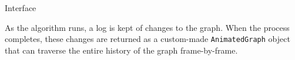 \documentclass{beamer}
\begin{document}
\begin{frame}[fragile,t]
\begin{columns}[t]
\begin{column}{.45\textwidth}
\begin{block}{Interface}
        \setlength\fboxsep{0pt}
        \setlength\fboxrule{.1ex}
        \vspace*{-.75in}
        \begin{center}
        \end{center}
        \begin{minipage}[b]{.49\linewidth}
          \raggedleft

          As the algorithm runs, a log is kept of changes to the
          graph.  When the process completes, these changes are
          returned as a custom-made \texttt{AnimatedGraph} object that
          can traverse the entire history of the graph frame-by-frame.

          \vspace*{2ex}
        \end{minipage}
      \end{block}
    \end{column}
  \end{columns}
\end{frame}
\end{document}
